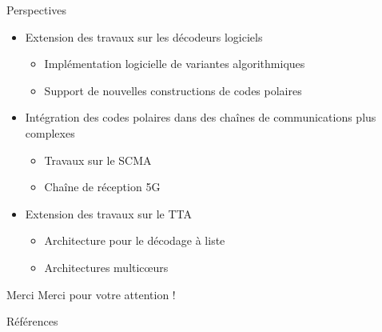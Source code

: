\begin{frame}[c]{Perspectives}

  \begin{itemize}
    \renewcommand*{\bibfont}{\scriptsize}
    \vfill
    \item<+-> Extension des travaux sur les décodeurs logiciels
    \begin{itemize}
      \item Implémentation logicielle de variantes algorithmiques
      \item Support de nouvelles constructions de codes polaires
    \end{itemize}
    \vfill
    \item<+-> Intégration des codes polaires dans des chaînes de communications plus complexes
    \begin{itemize}
      \item Travaux sur le SCMA
      \item Chaîne de réception 5G
    \end{itemize}
    \vfill
    \item<+-> Extension des travaux sur le TTA
    \begin{itemize}
      \item Architecture pour le décodage à liste
      \item Architectures multicœurs
    \end{itemize}
    \vfill
  \end{itemize}

\end{frame}

\begin{frame}[c]{Merci}
\vfill
\centering
Merci pour votre attention !
\vfill
\end{frame}

\begin{frame}[allowframebreaks]{Références}
\renewcommand*{\bibfont}{\scriptsize}

\printbibliography
\end{frame}

